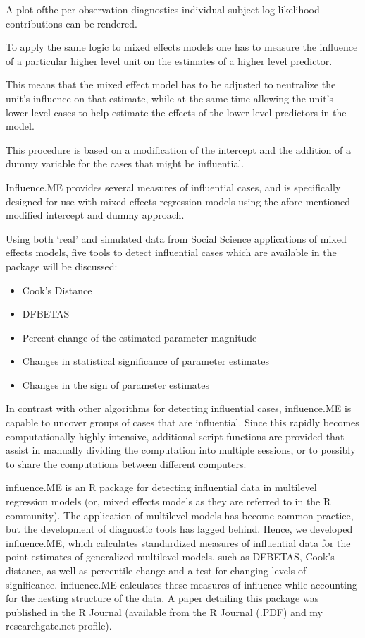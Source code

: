\documentclass[12pt, a4paper]{article}
\begin{document}
A plot ofthe per-observation diagnostics individual subject log-likelihood contributions can be rendered.

To apply the same logic to mixed effects models one has to measure the influence of a particular higher
level unit on the estimates of a higher level predictor. 

This means that the mixed effect model has to
be adjusted to neutralize the unit’s influence on that estimate, while at the same time allowing the unit’s
lower-level cases to help estimate the effects of the lower-level predictors in the model. 

This procedure is
based on a modification of the intercept and the addition of a dummy variable for the cases that might be
influential. 

Influence.ME provides several measures of influential cases, and is specifically designed for use
with mixed effects regression models using the afore mentioned modified intercept and dummy approach.

Using both ‘real’ and simulated data from Social Science applications of mixed effects models, five tools to
detect influential cases which are available in the package will be discussed:
\begin{itemize}
	\item Cook’s Distance
	\item DFBETAS
	\item Percent change of the estimated parameter magnitude
	\item Changes in statistical significance of parameter estimates
	\item Changes in the sign of parameter estimates
\end{itemize}
In contrast with other algorithms for detecting influential cases, influence.ME is capable to uncover
groups of cases that are influential. Since this rapidly becomes computationally highly intensive, additional
script functions are provided that assist in manually dividing the computation into multiple sessions, or to
possibly to share the computations between different computers.


influence.ME is an R package for detecting influential data in multilevel regression models (or, mixed effects models as they are referred to in the R community). The application of multilevel models has become common practice, but the development of diagnostic tools has lagged behind. Hence, we developed influence.ME, which calculates standardized measures of influential data for the point estimates of generalized multilevel models, such as DFBETAS, Cook’s distance, as well as percentile change and a test for changing levels of significance. influence.ME calculates these measures of influence while accounting for the nesting structure of the data. A paper detailing this package was published in the R Journal (available from the R Journal (.PDF) and my researchgate.net profile).
\end{document}
